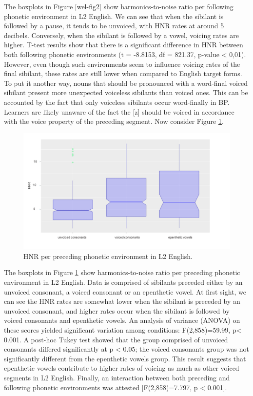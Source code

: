 The boxplots in Figure \ref{wel-fig2} show harmonics-to-noise ratio per following
phonetic environment in L2 English. We can see that when the sibilant is
followed by a pause, it tends to be unvoiced, with HNR rates at around 5
decibels. Conversely, when the sibilant is followed by a vowel, voicing
rates are higher. T-test results show that there is a significant
difference in HNR between both following phonetic environments (t = -8.8153, 
df = 821.37, p-value \textless{} 0,01). However, even though
such environments seem to influence voicing rates of the final sibilant,
these rates are still lower when compared to English target forms. To
put it another way, nouns that should be pronounced with a word-final
voiced sibilant present more unexpected voiceless sibilants than voiced
ones. This can be accounted by the fact that only voiceless sibilants
occur word-finally in BP. Learners are likely unaware of the fact the
{[}z{]} should be voiced in accordance with the voice property of the
preceding segment. Now consider Figure \ref{wel-fig3}.

\begin{figure}[h]
\centering
\includegraphics[width=\linewidth]{imgs/wellingfig03.png}
\caption{HNR per preceding phonetic environment in L2 English.}
\label{wel-fig3}
\end{figure}

The boxplots in Figure \ref{wel-fig3} show harmonics-to-noise ratio per preceding
phonetic environment in L2 English. Data is comprised of sibilants
preceded either by an unvoiced consonant, a voiced consonant or an
epenthetic vowel. At first sight, we can see the HNR rates are somewhat
lower when the sibilant is preceded by an unvoiced consonant, and higher
rates occur when the sibilant is followed by voiced consonants and
epenthetic vowels. An analysis of variance (ANOVA) on these scores
yielded significant variation among conditions: F(2,858)=59.99, 
p\textless{} 0.001. A post-hoc Tukey test showed that the group comprised
of unvoiced consonants differed significantly at p \textless{} 0.05; the
voiced consonants group was not significantly different from the
epenthetic vowels group. This result suggests that epenthetic vowels
contribute to higher rates of voicing as much as other voiced segments
in L2 English. Finally, an interaction between both preceding and
following phonetic environments was attested {[}F(2,858)=7.797, p
\textless{} 0.001{]}.


